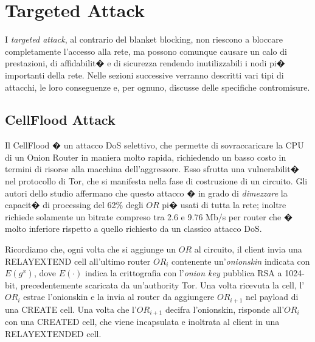 \chapter{Targeted Attack}
I \emph{targeted attack}, al contrario del blanket blocking, non riescono a bloccare completamente l'accesso alla rete, ma possono comunque causare un calo di prestazioni, di affidabilit� e di sicurezza rendendo inutilizzabili i nodi pi� importanti della rete. Nelle sezioni successive verranno descritti vari tipi di attacchi, le loro conseguenze e, per ognuno, discusse delle specifiche contromisure.
\section{CellFlood Attack}
Il CellFlood \cite{cellflood} � un attacco DoS selettivo, che permette di sovraccaricare la CPU di un Onion Router in maniera molto rapida, richiedendo un basso costo in termini di risorse alla macchina dell'aggressore. Esso sfrutta una vulnerabilit� nel protocollo di Tor, che si manifesta nella fase di costruzione di un circuito. Gli autori dello studio affermano che questo attacco � in grado di \emph{dimezzare} la capacit� di processing del 62\% degli $OR$ pi� usati di tutta la rete; inoltre richiede solamente un bitrate compreso tra 2.6 e 9.76 Mb/s per router che � molto inferiore rispetto a quello richiesto da un classico attacco DoS.

Ricordiamo che, ogni volta che si aggiunge un $OR$ al circuito, il client invia una {\ttfamily RELAY\textunderscore EXTEND} cell all'ultimo router $OR_{i}$ contenente un'\emph{onionskin} indicata con $E(g^x)$, dove $E(\cdot)$ indica la crittografia con l'\emph{onion key} pubblica RSA a 1024-bit, precedentemente scaricata da un'authority Tor. Una volta ricevuta la cell, l'$OR_{i}$ estrae l'onionskin e la invia al router da aggiungere $OR_{i+1}$ nel payload di una {\ttfamily CREATE} cell. Una volta che l'$OR_{i+1}$ decifra l'onionskin, risponde all'$OR_{i}$ con una {\ttfamily CREATED} cell, che viene incapsulata e inoltrata al client in una  {\ttfamily RELAY\textunderscore EXTENDED} cell.

